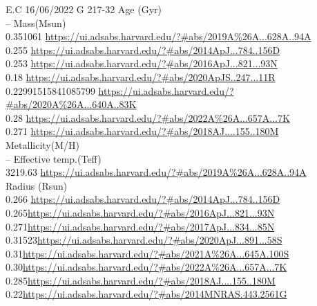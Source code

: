 E.C 16/06/2022
G 217-32
Age (Gyr)\\
--
Mass(Msun)\\
0.351061 \url{https://ui.adsabs.harvard.edu/?#abs/2019A%26A...628A..94A}\\
0.255 \url{https://ui.adsabs.harvard.edu/?#abs/2014ApJ...784..156D}\\
0.253 \url{https://ui.adsabs.harvard.edu/?#abs/2016ApJ...821...93N}\\
0.18 \url{https://ui.adsabs.harvard.edu/?#abs/2020ApJS..247...11R}\\
0.22991515841085799 \url{https://ui.adsabs.harvard.edu/?#abs/2020A%26A...640A..83K}\\
0.28 \url{https://ui.adsabs.harvard.edu/?#abs/2022A%26A...657A...7K}\\
0.271 \url{https://ui.adsabs.harvard.edu/?#abs/2018AJ....155..180M}\\
Metallicity(M/H)\\
--
Effective temp.(Teff)\\
3219.63 \url{https://ui.adsabs.harvard.edu/?#abs/2019A%26A...628A..94A}\\
Radius (Rsun)\\
0.266 \url{https://ui.adsabs.harvard.edu/?#abs/2014ApJ...784..156D}\\
0.265\url{https://ui.adsabs.harvard.edu/?#abs/2016ApJ...821...93N}\\
0.271\url{https://ui.adsabs.harvard.edu/?#abs/2017ApJ...834...85N}\\
0.31523\url{https://ui.adsabs.harvard.edu/?#abs/2020ApJ...891...58S}\\
0.31\url{https://ui.adsabs.harvard.edu/?#abs/2021A%26A...645A.100S}\\
0.30\url{https://ui.adsabs.harvard.edu/?#abs/2022A%26A...657A...7K}\\
0.285\url{https://ui.adsabs.harvard.edu/?#abs/2018AJ....155..180M}\\
0.22\url{https://ui.adsabs.harvard.edu/?#abs/2014MNRAS.443.2561G}\\

